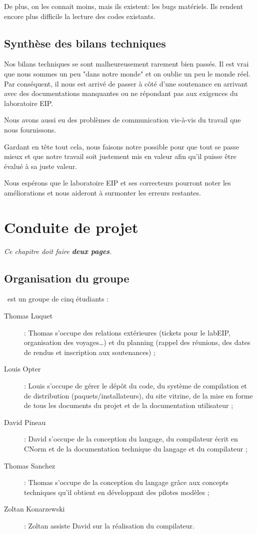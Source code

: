 \documentclass[francais]{rtxreport}
\begin{document}
De plus, on les connait moins, mais ils existent: les bugs matériels. Ils
rendent encore plus difficile la lecture des codes existants.

\section{Synthèse des bilans techniques}
Nos bilans techniques se sont malheureusement rarement bien passés. Il est vrai
que nous sommes un peu "dans notre monde" et on oublie un peu le monde réel.
Par conséquent, il nous est arrivé de passer à côté d’une soutenance en
arrivant avec des documentations manquantes ou ne répondant pas aux exigences
du laboratoire EIP.

Nous avons aussi eu des problèmes de communication vis-à-vis du travail que
nous fournissons.

Gardant en tête tout cela, nous faisons notre possible pour que tout se passe
mieux et que notre travail soit justement mis en valeur afin qu’il puisse être
évalué à sa juste valeur.

Nous espérons que le laboratoire EIP et ses correcteurs pourront noter les
améliorations et nous aideront à surmonter les erreurs restantes.

\chapter{Conduite de projet}

\emph{Ce chapitre doit faire \textbf{deux pages}.}

\section{Organisation du groupe}

\rtx\ est un groupe de cinq étudiants :
\begin{description}
\item[Thomas Luquet] : Thomas s'occupe des relations extérieures (tickets pour
le labEIP, organisation des voyages\ldots) et du planning (rappel des réunions,
des dates de rendus et inscription aux soutenances) ;
\item[Louis Opter] : Louis s'occupe de gérer le dépôt du code, du système de
compilation et de distribution (paquets/installateurs), du site vitrine, de la
mise en forme de tous les documents du projet et de la documentation
utilisateur ;
\item[David Pineau] : David s'occupe de la conception du langage, du
compilateur écrit en CNorm et de la documentation technique du langage et du
compilateur ;
\item[Thomas Sanchez] : Thomas s'occupe de la conception du langage grâce aux
concepts techniques qu'il obtient en développant des pilotes modèles ;
\item[Zoltan Konarzewski] : Zoltan assiste David sur la réalisation du
compilateur.
\end{description}
\end{document}
